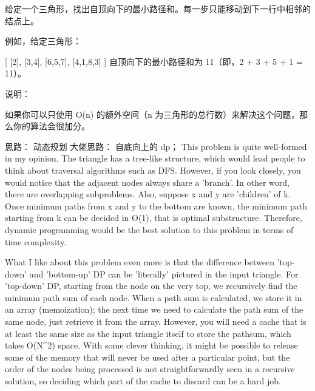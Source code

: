 给定一个三角形，找出自顶向下的最小路径和。每一步只能移动到下一行中相邻的结点上。

例如，给定三角形：

[
     [2],
    [3,4],
   [6,5,7],
  [4,1,8,3]
]
自顶向下的最小路径和为 11（即，2 + 3 + 5 + 1 = 11）。

说明：

如果你可以只使用 O(n) 的额外空间（n 为三角形的总行数）来解决这个问题，那么你的算法会很加分。





























思路：
动态规划
大佬思路： 自底向上的 dp；
This problem is quite well-formed in my opinion. The triangle has a tree-like structure, which would lead people to think about traversal algorithms such as DFS. However, if you look closely, you would notice that the adjacent nodes always share a 'branch'. In other word, there are overlapping subproblems. Also, suppose x and y are 'children' of k. Once minimum paths from x and y to the bottom are known, the minimum path starting from k can be decided in O(1), that is optimal substructure. Therefore, dynamic programming would be the best solution to this problem in terms of time complexity.

What I like about this problem even more is that the difference between 'top-down' and 'bottom-up' DP can be 'literally' pictured in the input triangle. For 'top-down' DP, starting from the node on the very top, we recursively find the minimum path sum of each node. When a path sum is calculated, we store it in an array (memoization); the next time we need to calculate the path sum of the same node, just retrieve it from the array. However, you will need a cache that is at least the same size as the input triangle itself to store the pathsum, which takes O(N^2) space. With some clever thinking, it might be possible to release some of the memory that will never be used after a particular point, but the order of the nodes being processed is not straightforwardly seen in a recursive solution, so deciding which part of the cache to discard can be a hard job.

